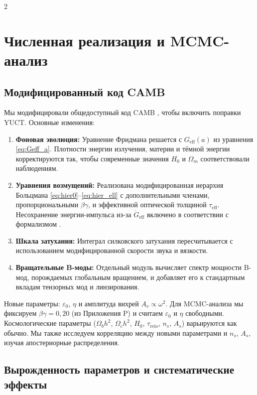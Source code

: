 \documentclass[11pt,a4paper]{article}
\begin{document}
	\begin{multicols}{2}
		
		\section{Численная реализация и MCMC-анализ}
		
		\subsection{Модифицированный код CAMB}
		
		Мы модифицировали общедоступный код CAMB \cite{Lewis2000}, чтобы включить поправки YUCT. Основные изменения:
		\begin{enumerate}
			\item \textbf{Фоновая эволюция:} Уравнение Фридмана решается с $G_{\mathrm{eff}}(a)$ из уравнения \eqref{eq:Geff_a}. Плотности энергии излучения, материи и тёмной энергии корректируются так, чтобы современные значения $H_0$ и $\Omega_m$ соответствовали наблюдениям.
			\item \textbf{Уравнения возмущений:} Реализована модифицированная иерархия Больцмана \eqref{eq:hier0}--\eqref{eq:hier_ell} с дополнительными членами, пропорциональными $\beta\gamma$, и эффективной оптической толщиной $\tau_{\mathrm{eff}}$. Несохранение энергии-импульса из-за $\dot{G}_{\mathrm{eff}}$ включено в соответствии с формализмом \cite{Uzan2011}.
			\item \textbf{Шкала затухания:} Интеграл силковского затухания пересчитывается с использованием модифицированной скорости звука и вязкости.
			\item \textbf{Вращательные B-моды:} Отдельный модуль вычисляет спектр мощности B-мод, порождаемых глобальным вращением, и добавляет его к стандартным вкладам тензорных мод и линзирования.
		\end{enumerate}
		Новые параметры: $\varepsilon_0$, $\eta$ и амплитуда вихрей $A_v \propto \omega^2$. Для MCMC-анализа мы фиксируем $\beta\gamma = 0,20$ (из Приложения P) и считаем $\varepsilon_0$ и $\eta$ свободными. Космологические параметры ($\Omega_b h^2$, $\Omega_c h^2$, $H_0$, $\tau_{\mathrm{reio}}$, $n_s$, $A_s$) варьируются как обычно. Мы также исследуем корреляцию между новыми параметрами и $n_s$, $A_s$, изучая апостериорные распределения.
		
		\subsection{Вырожденность параметров и систематические эффекты}
		

\end{multicols}
\end{document}
